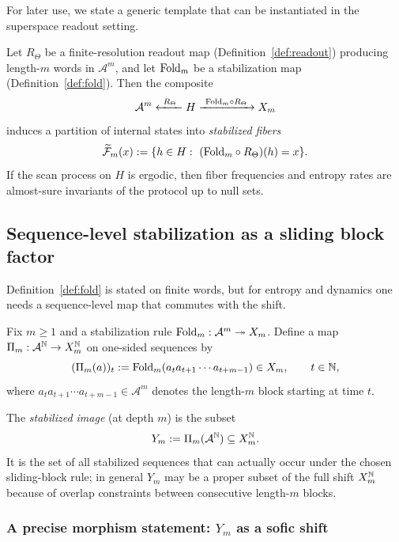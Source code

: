 For later use, we state a generic template that can be instantiated in the superspace readout setting.

\begin{proposition}\label{prop:fiber-template}
Let $R_\Theta$ be a finite-resolution readout map (Definition~\ref{def:readout}) producing length-$m$ words in $\mathcal{A}^m$, and let $\mathrm{Fold}_m$ be a stabilization map (Definition~\ref{def:fold}). Then the composite
\[
\mathcal{A}^m \xleftarrow{\ R_\Theta\ } H \xrightarrow{\ \mathrm{Fold}_m\circ R_\Theta\ } X_m
\]
induces a partition of internal states into \emph{stabilized fibers}
\[
\widetilde{\mathcal{F}}_m(x) := \{h\in H:\ (\Fold_m\circ R_\Theta)(h)=x\}.
\]
If the scan process on $H$ is ergodic, then fiber frequencies and entropy rates are almost-sure invariants of the protocol up to null sets.
\end{proposition}

\subsection{Sequence-level stabilization as a sliding block factor}\label{sec:stabilization:factor}

Definition~\ref{def:fold} is stated on finite words, but for entropy and dynamics one needs a sequence-level map that commutes with the shift.

\begin{definition}\label{def:Pi_m}
Fix $m\ge 1$ and a stabilization rule $\mathrm{Fold}_m:\mathcal{A}^m\twoheadrightarrow X_m$. Define a map $\Pi_m:\mathcal{A}^{\mathbb{N}}\to X_m^{\mathbb{N}}$ on one-sided sequences by
\[
(\Pi_m(a))_t := \mathrm{Fold}_m(a_t a_{t+1}\cdots a_{t+m-1})\in X_m,\qquad t\in\mathbb{N},
\]
where $a_t a_{t+1}\cdots a_{t+m-1}\in\mathcal{A}^m$ denotes the length-$m$ block starting at time $t$.
\end{definition}

\begin{definition}\label{def:Ym}
The \emph{stabilized image} (at depth $m$) is the subset
\[
Y_m := \Pi_m(\mathcal{A}^{\mathbb{N}}) \subseteq X_m^{\mathbb{N}}.
\]
It is the set of all stabilized sequences that can actually occur under the chosen sliding-block rule; in general $Y_m$ may be a proper subset of the full shift $X_m^{\mathbb{N}}$ because of overlap constraints between consecutive length-$m$ blocks.
\end{definition}

\subsubsection{A precise morphism statement: $Y_m$ as a sofic shift}\label{sec:stabilization:sofic}

